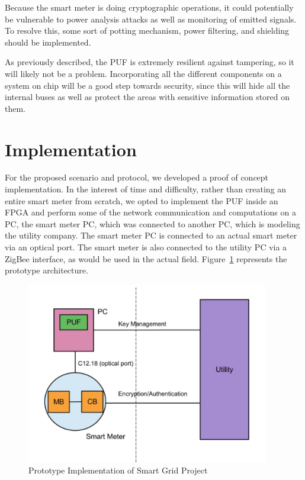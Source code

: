 Because the smart meter is doing cryptographic operations, it could potentially be vulnerable to power analysis
attacks as well as monitoring of emitted signals. To resolve this, some sort of potting mechanism, power filtering,
and shielding should be implemented. 

As previously described, the PUF is extremely resilient against tampering, so it will likely not be a problem.
Incorporating all the different components on a system on chip will be a good step towards security, since this will
hide all the internal buses as well as protect the areas with sensitive information stored on them.

\section{Implementation}
For the proposed scenario and protocol, we developed a proof of concept implementation. In the interest of time and
difficulty, rather than creating an entire smart meter from scratch, we opted to implement the 
PUF inside an FPGA and perform some of the network communication and computations on a PC, the smart meter
PC, which was connected to another PC, which is modeling the utility company. The smart meter PC is connected
to an actual smart meter via an optical port. The smart meter is also connected to the utility PC via a ZigBee interface,
as would be used in the actual field. Figure~\ref{fig:doeimpl} represents the prototype architecture.

\begin{figure}[!ht]
\centering
\includegraphics[width=400px]{images/doe_impl.jpg}
\caption{Prototype Implementation of Smart Grid Project}
\label{fig:doeimpl}
\end{figure}
\FloatBarrier

